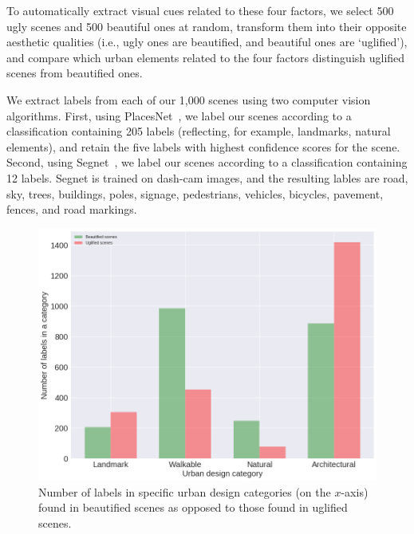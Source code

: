 To automatically extract visual cues related to these four factors, we select 500 ugly scenes and 500 beautiful ones at random, transform them into their opposite aesthetic qualities (i.e., ugly ones are beautified, and beautiful ones are `uglified'), and compare which urban elements related to the four factors distinguish uglified scenes from beautified ones. 

We extract labels from each of our 1,000 scenes using two computer vision algorithms. First, using PlacesNet~\cite{zhou2014learning}, we label our scenes according to a classification containing 205 labels (reflecting, for example, landmarks, natural elements), and retain the five labels with highest confidence scores for the scene. Second, using Segnet~\cite{badrinarayanan2015segnet}, we  label our scenes according to a classification containing 12 labels. Segnet is trained on dash-cam images, and the resulting lables are road, sky, trees,  buildings, poles, signage, pedestrians, vehicles, bicycles, pavement, fences, and road markings. 




\begin{figure}[h]
	\centering
	\includegraphics[width=\columnwidth]{Plot/taxonomyCount.png}
	\caption{Number of labels in specific urban design categories (on the $x$-axis) found in beautified scenes as opposed to those found in uglified scenes.}
	\label{fig:taxonomyCount}
\end{figure}


